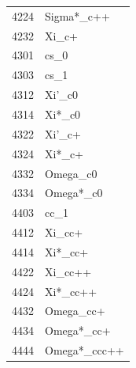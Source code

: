 \documentclass[a4paper,12pt]{article}
\begin{document}
\begin{multicols}{4}
\begin{table}[H]
{\begin{tabular}{|r|l|}
4224 &	Sigma*\_c++ \\
4232 &	Xi\_c+ \\
4301 &	cs\_0 \\
4303 &	cs\_1 \\
4312 &	Xi'\_c0 \\
4314 &	Xi*\_c0 \\
4322 &	Xi'\_c+ \\
4324 &	Xi*\_c+ \\
4332 &	Omega\_c0 \\
4334 &	Omega*\_c0 \\
4403 &	cc\_1 \\
4412 &	Xi\_cc+ \\
4414 &	Xi*\_cc+ \\
4422 &	Xi\_cc++ \\
4424 &	Xi*\_cc++ \\
4432 &	Omega\_cc+ \\
4434 &	Omega*\_cc+ \\
4444 &	Omega*\_ccc++ \\
 \end{tabular}
 }
\end{table}


\end{multicols}
\end{document}
